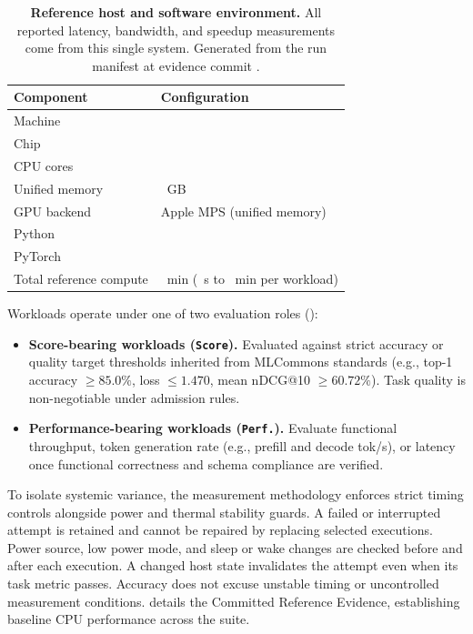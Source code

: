 \documentclass[10pt,twocolumn]{article}
\begin{document}
\begin{table}[t]
\centering
\caption{\textbf{Reference host and software environment.} All reported latency, bandwidth, and speedup measurements come from this single system. Generated from the run manifest at evidence commit \texttt{\EvidenceSourceCommit}.}
\label{tab:host}
\scriptsize
\renewcommand{\arraystretch}{1.20}
\begin{tabularx}{\columnwidth}{@{}>{\raggedright\arraybackslash}p{}X@{}}
\toprule
\textbf{Component} & \textbf{Configuration} \\
\midrule
Machine & \HostMachine{} \\
Chip & \HostChip{} \\
CPU cores & \HostCores{} \\
Unified memory & \HostMemoryGB{}~GB \\
GPU backend & Apple MPS (unified memory) \\
Python & \HostPython{} \\
PyTorch & \HostTorch{} \\
Total reference compute & \ScoreReferenceTotalMinutes{}~min (\ScoreReferenceMinSeconds{}~s to \ScoreReferenceMaxMinutes{}~min per workload) \\
\bottomrule
\end{tabularx}
\end{table}

Workloads operate under one of two evaluation roles ():
\begin{itemize}[leftmargin=*,itemsep=1.5pt]
\item \textbf{Score-bearing workloads (\texttt{Score}).} Evaluated against strict accuracy or quality target thresholds inherited from MLCommons standards (e.g., top-1 accuracy $\ge 85.0\%$, loss $\le 1.470$, mean nDCG@10 $\ge 60.72\%$). Task quality is non-negotiable under admission rules.
\item \textbf{Performance-bearing workloads (\texttt{Perf.}).} Evaluate functional throughput, token generation rate (e.g., prefill and decode tok/s), or latency once functional correctness and schema compliance are verified.
\end{itemize}

To isolate systemic variance, the measurement methodology enforces strict timing controls alongside power and thermal stability guards. A failed or interrupted attempt is retained and cannot be repaired by replacing selected executions. Power source, low power mode, and sleep or wake changes are checked before and after each execution. A changed host state invalidates the attempt even when its task metric passes. Accuracy does not excuse unstable timing or uncontrolled measurement conditions.  details the Committed Reference Evidence, establishing baseline CPU performance across the suite.
\end{document}
